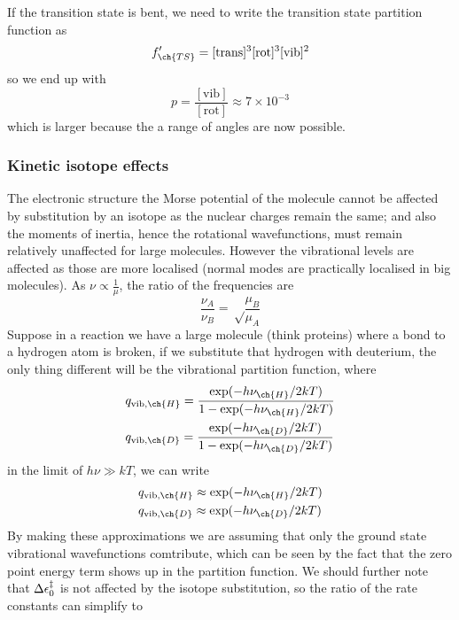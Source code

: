 If the transition state is bent, we need to write the transition state partition function as 
\begin{equation}
  f'_{\ch{TS}}=[\text{trans}]^3[\text{rot}]^3[\text{vib}]^2
\end{equation}
so we end up with
\begin{equation}
  p=\frac{[\text{vib}]}{[\text{rot}]}\approx7\times10^{-3}
\end{equation}
which is larger because the a range of angles are now possible.
\subsubsection{Kinetic isotope effects}
The electronic structure \ie the Morse potential of the molecule cannot be affected by substitution by an isotope as the nuclear charges remain the same; and also the moments of inertia, hence the rotational wavefunctions, must remain relatively unaffected for large molecules. However the vibrational levels are affected as those are more localised (normal modes are practically localised in big molecules). As $\nu\propto\frac{1}{\mu}$, the ratio of the frequencies are
\begin{equation}
  \frac{\nu_A}{\nu_B}=\sqrt\frac{\mu_B}{\mu_A}
\end{equation}
Suppose in a reaction we have a large molecule (think proteins) where a bond to a hydrogen atom is broken, if we substitute that hydrogen with deuterium, the only thing different will be the vibrational partition function, where
\begin{equation}
\begin{aligned}
  &q_{\text{vib},\ch{H}}=\frac{\exp(-h\nu_{\ch{H}}/2kT)}{1-\exp(-h\nu_{\ch{H}}/2kT)}\\
  &q_{\text{vib},\ch{D}}=\frac{\exp(-h\nu_{\ch{D}}/2kT)}{1-\exp(-h\nu_{\ch{D}}/2kT)} 
\end{aligned}
\end{equation}
in the limit of $h\nu\gg kT$, we can write
\begin{equation}
\begin{aligned}
 &q_{\text{vib},\ch{H}}\approx\exp(-h\nu_{\ch{H}}/2kT)\\
 &q_{\text{vib},\ch{D}}\approx\exp(-h\nu_{\ch{D}}/2kT)
\end{aligned}
\end{equation}
By making these approximations we are assuming that only the ground state vibrational wavefunctions comtribute, which can be seen by the fact that the zero point energy term shows up in the partition function. We should further note that $\Delta\epsilon_0^{\ddag}$ is not affected by the isotope substitution, so the ratio of the rate constants can simplify to
